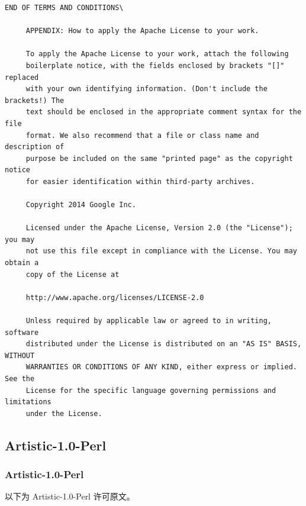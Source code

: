 \begin{lstlisting}[basicstyle=\ttfamily\footnotesize,breaklines=true]
     END OF TERMS AND CONDITIONS\

     APPENDIX: How to apply the Apache License to your work.

     To apply the Apache License to your work, attach the following
     boilerplate notice, with the fields enclosed by brackets "[]" replaced
     with your own identifying information. (Don't include the brackets!) The
     text should be enclosed in the appropriate comment syntax for the file
     format. We also recommend that a file or class name and description of
     purpose be included on the same "printed page" as the copyright notice
     for easier identification within third-party archives.

     Copyright 2014 Google Inc.

     Licensed under the Apache License, Version 2.0 (the "License"); you may
     not use this file except in compliance with the License. You may obtain a
     copy of the License at

     http://www.apache.org/licenses/LICENSE-2.0

     Unless required by applicable law or agreed to in writing, software
     distributed under the License is distributed on an "AS IS" BASIS, WITHOUT
     WARRANTIES OR CONDITIONS OF ANY KIND, either express or implied. See the
     License for the specific language governing permissions and limitations
     under the License.
\end{lstlisting}

\subsection{Artistic-1.0-Perl}
\subsubsection*{Artistic-1.0-Perl}

以下为 Artistic-1.0-Perl 许可原文。

